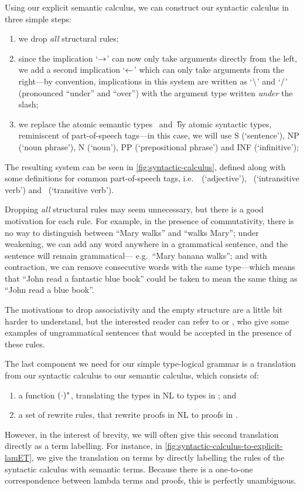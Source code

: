 Using our explicit semantic calculus, we can construct our syntactic
calculus in three simple steps:
\begin{enumerate}
\item%
  we drop \emph{all} structural rules;
\item%
  since the implication `$\rightarrow$' can now only take arguments directly
  from the left, we add a second implication `$\leftarrow$' which can only
  take arguments from the right---by convention, implications in this
  system are written as `$\mathbin{\backslash}$' and `$\mathbin{\slash}$' (pronounced ``under''
  and ``over'') with the argument type written \emph{under} the slash;
\item%
  we replace the atomic semantic types \e\ and \t\ by atomic syntactic
  types, reminiscent of part-of-speech tags---in this case, we will
  use S (`sentence'), NP (`noun phrase'), N (`noun'), PP
  (`prepositional phrase') and INF (`infinitive');
\end{enumerate}
The resulting system can be seen in \autoref{fig:syntactic-calculus},
defined along with some definitions for common part-of-speech tags,
i.e.\ \A\ (`adjective'), \IV\ (`intransitive verb') and \TV\
(`transitive verb').



Dropping \emph{all} structural rules may seem unnecessary, but there
is a good motivation for each rule.  For example, in the presence of
commutativity, there is no way to distinguish between ``Mary walks''
and ``walks Mary''; under weakening, we can add any word anywhere in a
grammatical sentence, and the sentence will remain grammatical---
e.g.\ ``Mary banana walks''; and with contraction, we can remove
consecutive words with the same type---which means that ``John read
a fantastic blue book'' could be taken to mean the same thing as
``John read a blue book''.

The motivations to drop associativity and the empty structure are a
little bit harder to understand, but the interested reader can refer
to \citet[p. 33, 105-106]{moot2012} or \citet{lambek1961}, who give
some examples of  ungrammatical sentences that would be accepted in
the presence of these rules.

\vspace*{1\baselineskip}

The last component we need for our simple type-logical grammar is a
translation from our syntactic calculus to our semantic calculus,
which consists of:
\begin{enumerate}[label=(\arabic*)]
\item
  a function $({\cdot})^*$, translating the types in NL to types in \lamET; and
\item
  a set of rewrite rules, that rewrite proofs in NL to proofs in \lamET.
\end{enumerate}
However, in the interest of brevity, we will often give this second
translation directly as a term labelling. For instance, in
\autoref{fig:syntactic-calculus-to-explicit-lamET}, we give the
translation on terms by directly labelling the rules of the syntactic
calculus with semantic terms. Because there is a one-to-one
correspondence between lambda terms and proofs, this is perfectly
unambiguous.

